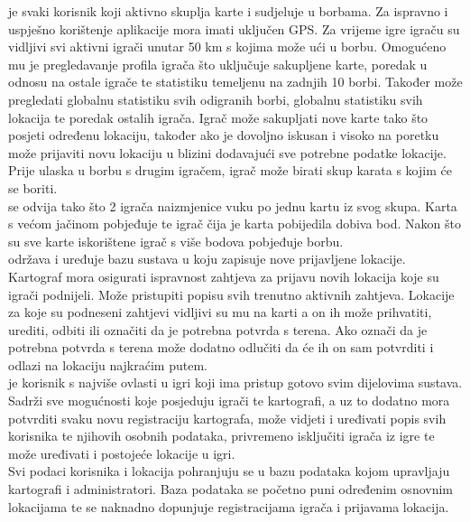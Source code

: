 \textit {} je svaki korisnik koji aktivno skuplja karte i sudjeluje u borbama. Za ispravno i uspješno korištenje aplikacije mora imati uključen GPS.
Za vrijeme igre igraču su vidljivi svi aktivni igrači unutar 50 km s kojima može ući u borbu. Omogućeno mu je pregledavanje profila igrača što uključuje sakupljene karte, poredak u odnosu na ostale igrače te statistiku temeljenu na zadnjih 10 borbi.
Također može pregledati globalnu statistiku svih odigranih borbi, globalnu statistiku svih lokacija te poredak ostalih igrača. Igrač može sakupljati nove karte tako što posjeti određenu lokaciju, također ako je dovoljno iskusan i visoko na poretku može prijaviti novu lokaciju u blizini dodavajući sve potrebne podatke lokacije. Prije ulaska u borbu s drugim igračem, igrač može birati skup karata s kojim će se boriti.\\

\textit {} se odvija tako što 2 igrača naizmjenice vuku po jednu kartu iz svog skupa. Karta s većom jačinom pobjeđuje te igrač čija je karta pobijedila dobiva bod. Nakon što su sve karte iskorištene igrač s više bodova pobjeđuje borbu.\\

\textit {} održava i uređuje bazu sustava u koju zapisuje nove prijavljene lokacije.
Kartograf mora osigurati ispravnost zahtjeva za prijavu novih lokacija koje su igrači podnijeli. Može pristupiti popisu svih trenutno aktivnih zahtjeva. Lokacije za koje su podneseni zahtjevi vidljivi su mu na karti a on ih može prihvatiti, urediti, odbiti ili označiti da je potrebna potvrda s terena. Ako označi da je potrebna potvrda s terena može dodatno odlučiti da će ih on sam potvrditi i odlazi na lokaciju najkraćim putem.\\

\textit {} je korisnik s najviše ovlasti u igri koji ima pristup gotovo svim dijelovima sustava. Sadrži sve mogućnosti koje posjeduju igrači te kartografi, a uz to dodatno mora potvrditi svaku novu registraciju kartografa, može vidjeti i uređivati popis svih korisnika te njihovih osobnih podataka, privremeno isključiti igrača iz igre te može uređivati i postojeće lokacije u igri.\\

Svi podaci korisnika i lokacija pohranjuju se u bazu podataka kojom upravljaju kartografi i administratori. Baza podataka se početno puni određenim osnovnim lokacijama te se naknadno dopunjuje registracijama igrača i prijavama lokacija.\\

